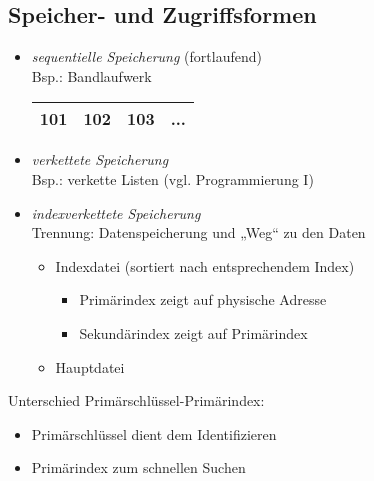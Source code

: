 \subsection{Speicher- und Zugriffsformen}
\begin{itemize}
\item \emph{sequentielle Speicherung} (fortlaufend)\\
Bsp.: Bandlaufwerk\\
\begin{tabular}{| c | c | c | c}
101 & 102 & 103 & ...\\
\hline
\end{tabular}
\item \emph{verkettete Speicherung}\\
Bsp.: verkette Listen (vgl. Programmierung I)
\item \emph{indexverkettete Speicherung}\\
Trennung: Datenspeicherung und „Weg“ zu den Daten
\begin{itemize}
\item Indexdatei (sortiert nach entsprechendem Index)
\begin{itemize}
\item Primärindex zeigt auf physische Adresse
\item Sekundärindex zeigt auf Primärindex
\end{itemize}
\item Hauptdatei
\end{itemize}
\end{itemize}
Unterschied Primärschlüssel-Primärindex:
\begin{itemize}
\item Primärschlüssel dient dem Identifizieren
\item Primärindex zum schnellen Suchen
\end{itemize}

